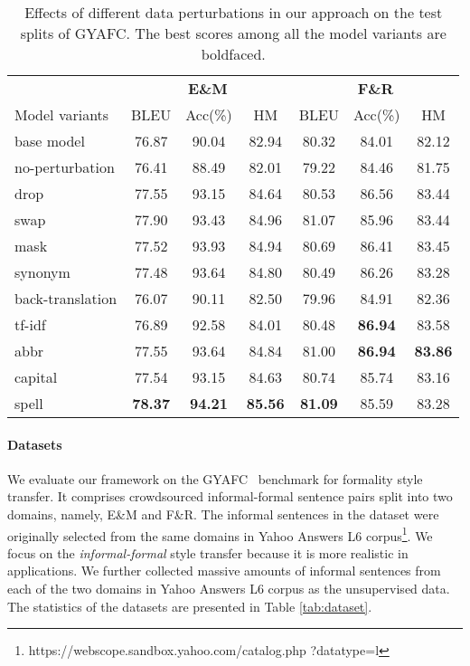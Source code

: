 \begin{table*}[t]
    \centering
 \small
\begin{tabular}{lcccccc}
        \toprule
        & \multicolumn{3}{c}{\textbf{E\&M}} & \multicolumn{3}{c}{\textbf{F\&R}} \\
 \cmidrule(lr){2-4} \cmidrule(lr){5-7} 
     Model variants    & BLEU & Acc(\%)& HM & BLEU & Acc(\%) & HM \\
     \midrule
      base model  & 76.87  & 90.04 & 82.94 & 80.32 & 84.01 & 82.12 \\
      no-perturbation & 76.41 &	88.49 & 	82.01 & 79.22 &	84.46 &	81.75 \\	
      \midrule
      drop & 77.55 & 93.15 & 84.64& 80.53 &	86.56 &	83.44 \\
      swap & 77.90 &	93.43&	84.96& 81.07 &	85.96 & 83.44 \\
      mask & 77.52&	93.93&	84.94 & 80.69 &	86.41 &	83.45\\
      synonym &77.48 & 93.64 & 84.80 & 80.49 &	86.26 &	83.28 \\
      \midrule
      back-translation & 76.07 &	90.11&	82.50& 79.96 &	84.91 &	82.36 \\
      tf-idf & 76.89 & 92.58 &84.01 & 80.48 &	\textbf{86.94} &	83.58 \\
      \midrule
      abbr & 77.55 &	93.64 &	84.84 & 81.00 &	\textbf{86.94} &	\textbf{83.86} \\
      capital &77.54 &	93.15 &	84.63 & 80.74 &	85.74 &	83.16\\
      spell & \textbf{78.37} &\textbf{94.21}&	\textbf{85.56}& \textbf{81.09} &	85.59 &	83.28  \\
        \bottomrule
    \end{tabular}
\caption{Effects of different data perturbations in our approach on the test splits of GYAFC. The best scores among all the model variants are boldfaced.}
    \label{tab:da-res}
\end{table*}

\paragraph{Datasets} We evaluate our framework on the GYAFC~\cite{rao2018dear} benchmark for formality style transfer. It comprises crowdsourced informal-formal sentence pairs split into two domains, namely, E\&M and F\&R. The informal sentences in the dataset were originally selected from the same domains in Yahoo Answers L6 corpus\footnote{https://webscope.sandbox.yahoo.com/catalog.php
?datatype=l}. We focus on the \textit{informal-formal} style transfer because it is more realistic in applications.
We further collected massive amounts of informal sentences from each of the two domains in Yahoo Answers L6 corpus as the unsupervised data. The statistics of the datasets are presented in Table \ref{tab:dataset}. 





